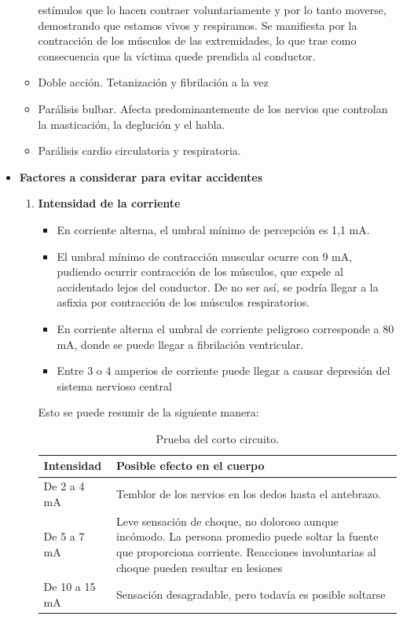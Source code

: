\documentclass{report}
\begin{document}
\begin{itemize}
\begin{itemize}
estímulos que lo hacen contraer voluntariamente y por lo tanto moverse,
demostrando que estamos vivos y respiramos. Se manifiesta por la
contracción de los músculos de las extremidades, lo que trae como
consecuencia que la víctima quede prendida al conductor.
\item Doble acción. Tetanización y fibrilación a la vez
\item Parálisis bulbar. Afecta predominantemente de los nervios que controlan la
masticación, la deglución y el habla.
\item Parálisis cardio circulatoria y respiratoria.
\end{itemize}
\item \textbf{Factores a considerar para evitar accidentes}\\
\begin{enumerate}
\item \textbf{Intensidad de la corriente}
\begin{itemize}
\item En corriente alterna, el umbral mínimo de percepción es 1,1 mA.
\item El umbral mínimo de contracción muscular ocurre con 9 mA,
pudiendo ocurrir contracción de los músculos, que expele al
accidentado lejos del conductor. De no ser así, se podría llegar a la
asfixia por contracción de los músculos respiratorios.
\item En corriente alterna el umbral de corriente peligroso corresponde a
80 mA, donde se puede llegar a fibrilación ventricular.
\item Entre 3 o 4 amperios de corriente puede llegar a causar depresión
del sistema nervioso central
\end{itemize}
Esto se puede resumir de la siguiente manera:
\begin{table}[H]
	\caption{Prueba del corto circuito.}
	\label{tab:ACT1}
	\centering
	\begin{tabular}[t]{| >{\centering\arraybackslash}m{2cm} | >{\arraybackslash}m{8cm} |}
		\hline
		\textbf{Intensidad} & \textbf{Posible efecto en el cuerpo} \\
		\hline
		De 2 a 4 mA & Temblor de los nervios en los dedos hasta el antebrazo. \\
		\hline
		De 5 a 7 mA & Leve sensación de choque, no doloroso aunque incómodo.
		La persona promedio puede soltar la fuente que proporciona
		corriente. Reacciones involuntarias al choque pueden
		resultar en lesiones \\
		\hline
		De 10 a 15 mA & Sensación desagradable, pero todavía es posible soltarse \\

\end{tabular}
\end{table}
\end{enumerate}
\end{itemize}
\end{document}
